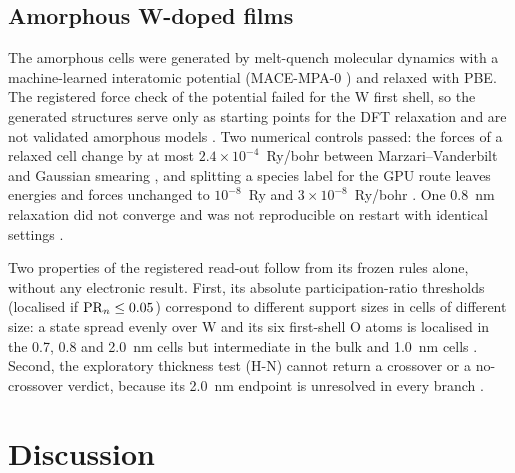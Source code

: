 \documentclass[11pt]{article}
\begin{document}
\subsection{Amorphous W-doped films}
\label{sec:r-amorphous}

The amorphous cells were generated by melt-quench molecular dynamics with a machine-learned interatomic potential
(MACE-MPA-0 \citep{Batatia2022,Batatia2023}) and relaxed with PBE. The registered force check of the potential failed
for the W first shell, so the generated structures serve only as starting points for the DFT relaxation and are not
validated amorphous models . Two numerical controls passed: the forces of a relaxed cell change by at most
$2.4\times10^{-4}$~Ry/bohr between Marzari--Vanderbilt and Gaussian smearing , and splitting a species
label for the GPU route leaves energies and forces unchanged to $10^{-8}$~Ry and $3\times10^{-8}$~Ry/bohr
. One 0.8~nm relaxation did not converge and was not reproducible on restart with identical settings
.

Two properties of the registered read-out follow from its frozen rules alone, without any electronic result. First, its
absolute participation-ratio thresholds (localised if $\mathrm{PR}_n \le 0.05$) correspond to different support sizes in cells
of different size: a state spread evenly over W and its six first-shell O atoms is localised in the 0.7, 0.8 and 2.0~nm
cells but intermediate in the bulk and 1.0~nm cells . Second, the exploratory thickness test (H-N) cannot
return a crossover or a no-crossover verdict, because its 2.0~nm endpoint is unresolved in every branch .

\section{Discussion}
\label{sec:discussion}
\end{document}
